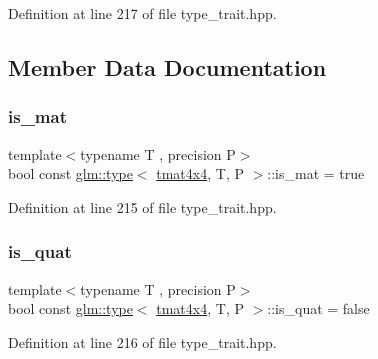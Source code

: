 Definition at line 217 of file type\+\_\+trait.\+hpp.



\subsection{Member Data Documentation}
\mbox{\label{structglm_1_1type_3_01tmat4x4_00_01_t_00_01_p_01_4_a3bc0b9ef269a235e7b2d5906e2e7253c}} 
\subsubsection{\texorpdfstring{is\_mat}{is\_mat}}
{\footnotesize\ttfamily template$<$typename T , precision P$>$ \\
bool const \mbox{\hyperlink{structglm_1_1type}{glm\+::type}}$<$ \mbox{\hyperlink{structglm_1_1tmat4x4}{tmat4x4}}, T, P $>$\+::is\+\_\+mat = true\hspace{0.3cm}{\ttfamily [static]}}



Definition at line 215 of file type\+\_\+trait.\+hpp.

\mbox{\label{structglm_1_1type_3_01tmat4x4_00_01_t_00_01_p_01_4_a9a1b997e80e58045c52834e655152b6b}} 
\subsubsection{\texorpdfstring{is\_quat}{is\_quat}}
{\footnotesize\ttfamily template$<$typename T , precision P$>$ \\
bool const \mbox{\hyperlink{structglm_1_1type}{glm\+::type}}$<$ \mbox{\hyperlink{structglm_1_1tmat4x4}{tmat4x4}}, T, P $>$\+::is\+\_\+quat = false\hspace{0.3cm}{\ttfamily [static]}}



Definition at line 216 of file type\+\_\+trait.\+hpp.

\mbox{\label{structglm_1_1type_3_01tmat4x4_00_01_t_00_01_p_01_4_a4419e728cd42ebd91882e8ca3930d483}} 
